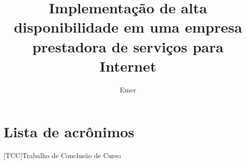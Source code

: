 \documentclass{iiufrgs}
\title{Implementação de alta disponibilidade em uma empresa prestadora de serviços para Internet}
\author{Emer}{Bruno}
\begin{document}
\maketitle



\tableofcontents

\chapter*{Lista de acrônimos}

\vspace{20px}

\begin{acronym}[XXXXXXXXXX]
[TCC]{Trabalho de Conclusão de Curso}

\end{acronym}

\listoffigures
\listoftables

\begin{abstract}

\end{abstract}



%
%
%



\end{document}
